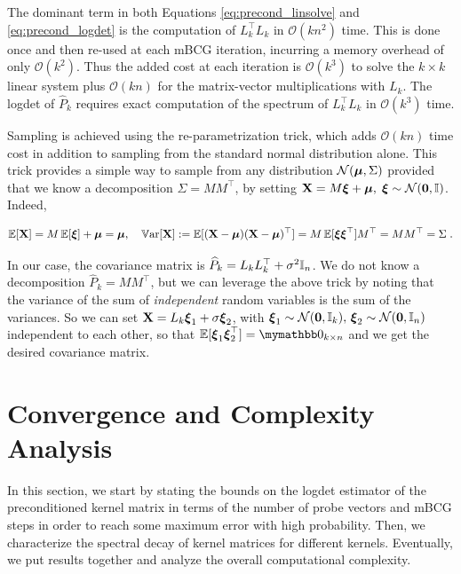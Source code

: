 \documentclass{article}
\begin{document}
{The dominant term in both Equations \eqref{eq:precond_linsolve} and \eqref{eq:precond_logdet} is the computation of $L_k^\top L_k$ in $\mathcal O(kn^2)$ time. This is done once and then re-used at each mBCG iteration, incurring a memory overhead of only $\mathcal O(k^2)$. Thus the added cost at each iteration is $\mathcal O(k^3)$ to solve the $k \times k$ linear system plus $\mathcal O(kn)$ for the matrix-vector multiplications with $L_k$.
The logdet of $\widehat P_k$ requires exact computation of the spectrum of $L_k^\top L_k$ in $\mathcal O(k^3)$ time.

Sampling is achieved using the re-parametrization trick, which adds $\mathcal O(kn)$ time cost in addition to sampling from the standard normal distribution alone.
This trick provides a simple way to sample from any distribution $\mathcal N(\boldsymbol{\mathbf{\mu}}, \Sigma)$ provided that we know a decomposition $\Sigma = M M^\top$, by setting $\vect X = M \vect \xi + \vect\mu, \; \vect\xi \sim \mathcal N(\vect 0, \Id)$. Indeed,

\begin{equation*}
    \operatorname{\mathbb{E}}[\boldsymbol{\mathbf{X}}] = M \operatorname{\mathbb{E}}[\boldsymbol{\mathbf{\xi}}] + \boldsymbol{\mathbf{\mu}} = \boldsymbol{\mathbf{\mu}}, \quad \operatorname{\mathbb{V}ar}[\boldsymbol{\mathbf{X}}] := \operatorname{\mathbb{E}}[(\boldsymbol{\mathbf{X}}-\boldsymbol{\mathbf{\mu}})(\boldsymbol{\mathbf{X}} - \boldsymbol{\mathbf{\mu}})^\top] = M \operatorname{\mathbb{E}}[\boldsymbol{\mathbf{\xi}} \boldsymbol{\mathbf{\xi}}^\top] M^\top = M M^\top = \Sigma \; .
\end{equation*}

In our case, the covariance matrix is $\widehat P_k = L_kL_k^\top + \sigma^2 \Id[n]$. We do not know a decomposition $\widehat P_k = M M^\top$, but we can leverage the above trick by noting that the variance of the sum of \emph{independent} random variables is the sum of the variances. So we can set $\boldsymbol{\mathbf{X}} = L_k \boldsymbol{\mathbf{\xi}}_1 + \sigma \boldsymbol{\mathbf{\xi}}_2$, with $\vect\xi_1 \sim \mathcal N(\vect 0, \Id[k]), \, \vect\xi_2 \sim \mathcal N(\vect 0, \Id[n])$ independent to each other, so that $\E[\vect \xi_1 \vect \xi_2^\top] = \mymathbb 0_{k\times n}$ and we get the desired covariance matrix.




\section{Convergence and Complexity Analysis} \label{sec:convergence}

In this section, we start by stating the bounds on the logdet estimator of the preconditioned kernel matrix in terms of the number of probe vectors and mBCG steps in order to reach some maximum error with high probability. Then, we characterize the spectral decay of kernel matrices for different kernels. Eventually, we put results together and analyze the overall computational complexity. 

}
\end{document}
